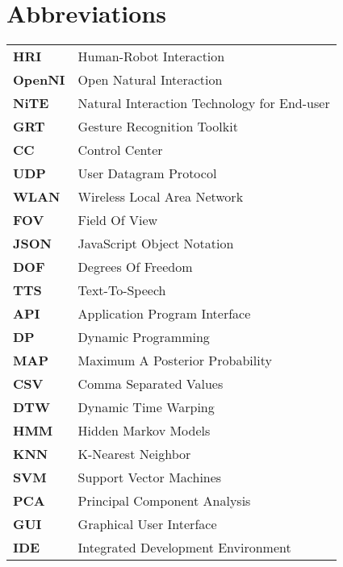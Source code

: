 \chapter*{Abbreviations}
\begin{center}
	\begin{tabular}
		{ll}

		\textbf{HRI} & Human-Robot Interaction\\		
		\textbf{OpenNI} & Open Natural Interaction\\
		\textbf{NiTE} & Natural Interaction Technology for End-user\\
		\textbf{GRT} & Gesture Recognition Toolkit\\
		\textbf{CC} & Control Center\\
		\textbf{UDP} & User Datagram Protocol\\
		\textbf{WLAN} & Wireless Local Area Network\\				
		\textbf{FOV} & Field Of View\\
		\textbf{JSON} & JavaScript Object Notation\\
		\textbf{DOF} & Degrees Of Freedom\\
		\textbf{TTS} & Text-To-Speech\\
		\textbf{API} & Application Program Interface\\		
		\textbf{DP} & Dynamic Programming\\		
		\textbf{MAP} & Maximum A Posterior Probability\\
		\textbf{CSV} & Comma Separated Values\\
		\textbf{DTW} & Dynamic Time Warping\\
		\textbf{HMM} & Hidden Markov Models\\
		\textbf{KNN} & K-Nearest Neighbor\\
		\textbf{SVM} & Support Vector Machines\\
		\textbf{PCA} & Principal Component Analysis\\
		\textbf{GUI} & Graphical User Interface\\
		\textbf{IDE} & Integrated Development Environment\\		
		
	\end{tabular}
\end{center}


